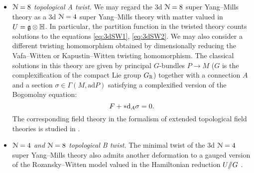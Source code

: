 \documentclass[10pt, oneside]{article}
\begin{document}
\begin{itemize}
\item \emph{$\mathcal N=8$ topological A twist.} We may regard the 3d $\mathcal N=8$ super Yang--Mills theory as a 3d $\mathcal N=4$ super Yang--Mills theory with matter valued in $U=\mathfrak g\otimes\mathbb{H}$. In particular, the partition function in the twisted theory counts solutions to the equations \eqref{eq:3dSW1}, \eqref{eq:3dSW2}. We may also consider a different twisting homomorphism obtained by dimensionally reducing the Vafa--Witten or Kapustin--Witten twisting homomorphism. The classical solutions in this theory are given by principal $G$-bundles $P\rightarrow M$ ($G$ is the complexification of the compact Lie group $G_\mathbb R$) together with a connection $A$ and a section $\sigma\in\Gamma(M, \mathrm{ad} P)$ satisfying a complexified version of the Bogomolny equation:
\[
F + \ast {\rm d}_A \sigma = 0.
\]
The corresponding field theory in the formalism of extended topological field theories is studied in \cite{BZGN}.

 \item \emph{$\mathcal{N}=4$ and $\mathcal{N}=8$ topological B twist.} The minimal twist of the 3d $\mathcal N=4$ super Yang--Mills theory also admits another deformation to a gauged version of the Rozansky--Witten model valued in the Hamiltonian reduction $U/\!\!/ G$ \cite{RozanskyWitten,BlauThompson2}.
 \end{itemize}
\end{document}
